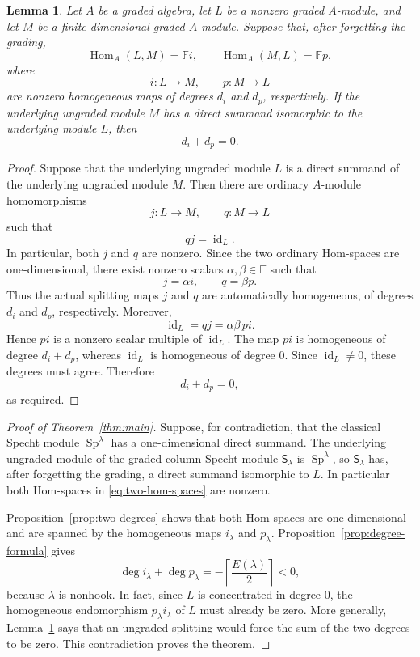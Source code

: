\documentclass[11pt,reqno]{amsart}
\numberwithin{equation}{section}
\newtheorem{lemma}[theorem]{Lemma}
\theoremstyle{remark}
\newcommand{\F}{\mathbb F}
\newcommand{\Hom}{\operatorname{Hom}}
\newcommand{\JSp}{\operatorname{Sp}}
\newcommand{\CS}{\mathsf S}
\begin{document}
\begin{lemma}\label{lem:splitting}
Let $A$ be a graded algebra, let $L$ be a nonzero graded $A$-module,
and let $M$ be a finite-dimensional graded $A$-module.  Suppose that,
after forgetting the grading,
\[
\Hom_A(L,M)=\F i,
\qquad
\Hom_A(M,L)=\F p,
\]
where
\[
i:L\longrightarrow M,
\qquad
p:M\longrightarrow L
\]
are nonzero homogeneous maps of degrees $d_i$ and $d_p$,
respectively.  If the underlying ungraded module $M$ has a direct
summand isomorphic to the underlying module $L$, then
\[
d_i+d_p=0.
\]
\end{lemma}

\begin{proof}
Suppose that the underlying ungraded module $L$ is a direct summand
of the underlying ungraded module $M$.  Then there are ordinary
$A$-module homomorphisms
\[
j:L\longrightarrow M,
\qquad
q:M\longrightarrow L
\]
such that
\[
qj=\operatorname{id}_L.
\]
In particular, both $j$ and $q$ are nonzero.  Since the two ordinary
Hom-spaces are one-dimensional, there exist nonzero scalars
$\alpha,\beta\in\F$ such that
\[
j=\alpha i,
\qquad
q=\beta p.
\]
Thus the actual splitting maps $j$ and $q$ are automatically
homogeneous, of degrees $d_i$ and $d_p$, respectively.  Moreover,
\[
\operatorname{id}_L=qj=\alpha\beta\,pi.
\]
Hence $pi$ is a nonzero scalar multiple of $\operatorname{id}_L$.  The map $pi$ is
homogeneous of degree $d_i+d_p$, whereas $\operatorname{id}_L$ is homogeneous of
degree $0$.  Since $\operatorname{id}_L\ne0$, these degrees must agree.  Therefore
\[
d_i+d_p=0,
\]
as required.
\end{proof}
\begin{proof}[Proof of Theorem~\ref{thm:main}]
Suppose, for contradiction, that the classical Specht module $\JSp^\lambda$ has a one-dimensional direct summand.  The underlying ungraded module of the graded column Specht module $\CS_\lambda$ is $\JSp^\lambda$, so $\CS_\lambda$ has, after forgetting the grading, a direct summand isomorphic to $L$.  In particular both Hom-spaces in \eqref{eq:two-hom-spaces} are nonzero.

Proposition~\ref{prop:two-degrees} shows that both Hom-spaces are one-dimensional and are spanned by the homogeneous maps $i_\lambda$ and $p_\lambda$.  Proposition~\ref{prop:degree-formula} gives
\[
\deg i_\lambda+\deg p_\lambda
=-\left\lceil\frac{E(\lambda)}2\right\rceil<0,
\]
because $\lambda$ is nonhook.  In fact, since $L$ is concentrated in degree $0$, the homogeneous endomorphism $p_\lambda i_\lambda$ of $L$ must already be zero.  More generally, Lemma~\ref{lem:splitting} says that an ungraded splitting would force the sum of the two degrees to be zero.  This contradiction proves the theorem.
\end{proof}
\end{document}

